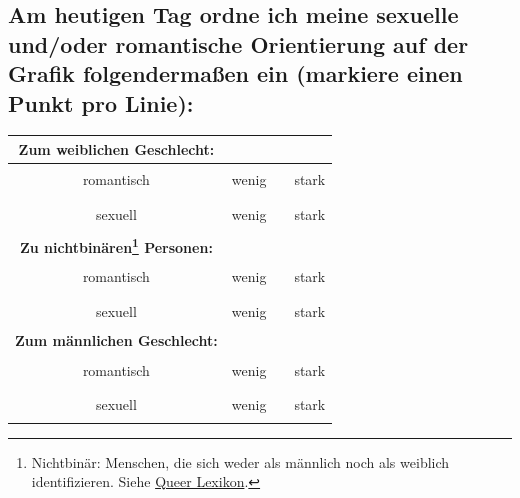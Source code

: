 \documentclass[a4paper,12pt]{article}
\begin{document}
\subsection*{Am heutigen Tag ordne ich meine sexuelle und/oder romantische Orientierung auf der Grafik folgendermaßen ein (markiere einen Punkt pro Linie):}

\begin{tabular}{|c|c|c|c|}
    \hline
    \textbf{Zum weiblichen Geschlecht:} & & & \\  
    \hline
    romantisch & wenig & \rule{5cm}{0.2pt} & stark \\
    sexuell & wenig & \rule{5cm}{0.2pt} & stark \\
    \hline
    \textbf{Zu nichtbinären\footnote{Nichtbinär: Menschen, die sich weder als männlich noch als weiblich identifizieren. Siehe \href{https://queer-lexikon.net/uebersichtsseiten/trans/}{Queer Lexikon}.} Personen:} & & & \\  
    \hline
    romantisch & wenig & \rule{5cm}{0.2pt} & stark \\
    sexuell & wenig & \rule{5cm}{0.2pt} & stark \\
    \hline
    \textbf{Zum männlichen Geschlecht:} & & & \\  
    \hline
    romantisch & wenig & \rule{5cm}{0.2pt} & stark \\
    sexuell & wenig & \rule{5cm}{0.2pt} & stark \\
    \hline
\end{tabular}
\end{document}
